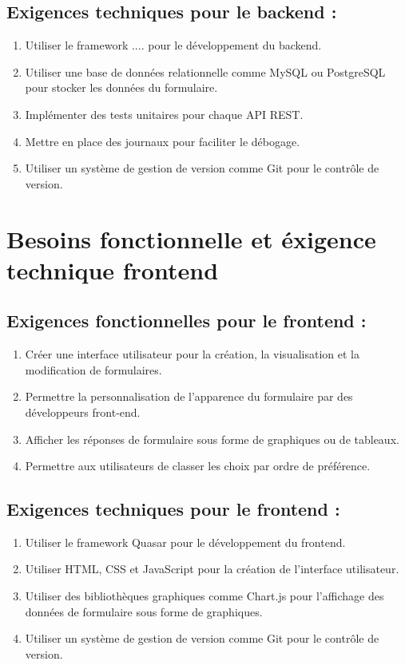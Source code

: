 \documentclass{article}
\begin{document}
\subsection{Exigences techniques pour le backend :}
\begin{enumerate}
\item Utiliser le framework .... pour le développement du backend.
\item Utiliser une base de données relationnelle comme MySQL ou PostgreSQL pour stocker les données du formulaire.
\item Implémenter des tests unitaires pour chaque API REST.
\item Mettre en place des journaux pour faciliter le débogage.
\item Utiliser un système de gestion de version comme Git pour le contrôle de version.
\end{enumerate}
\newpage


\section{Besoins fonctionnelle et éxigence technique frontend}
\subsection{Exigences fonctionnelles pour le frontend :}
\begin{enumerate}
\item Créer une interface utilisateur pour la création, la visualisation et la modification de formulaires.
\item Permettre la personnalisation de l'apparence du formulaire par des développeurs front-end.
\item Afficher les réponses de formulaire sous forme de graphiques ou de tableaux.
\item Permettre aux utilisateurs de classer les choix par ordre de préférence.

\end{enumerate}
\subsection{Exigences techniques pour le frontend :}
\begin{enumerate}
\item Utiliser le framework Quasar pour le développement du frontend.
\item Utiliser HTML, CSS et JavaScript pour la création de l'interface utilisateur.
\item Utiliser des bibliothèques graphiques comme Chart.js pour l'affichage des données de formulaire sous forme de graphiques.
\item Utiliser un système de gestion de version comme Git pour le contrôle de version.

\end{enumerate}
\end{document}
